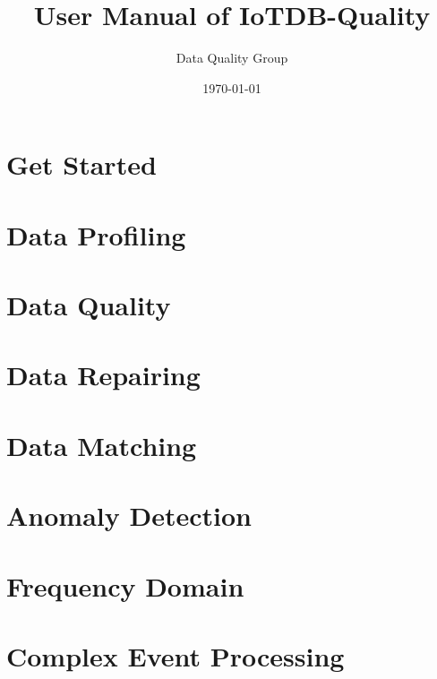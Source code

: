 \documentclass[11pt,color=green,table]{elegantbook}
\title{User Manual of IoTDB-Quality}
\author{Data Quality Group}
\institute{School of Software, Tsinghua University}
\date{\today}
\begin{document}
\maketitle
\tableofcontents
\mainmatter

\chapter{Get Started}




\chapter{Data Profiling}














\chapter{Data Quality}





\chapter{Data Repairing}





\chapter{Data Matching}








\chapter{Anomaly Detection}





\chapter{Frequency Domain}






\chapter{Complex Event Processing}







\end{document}
